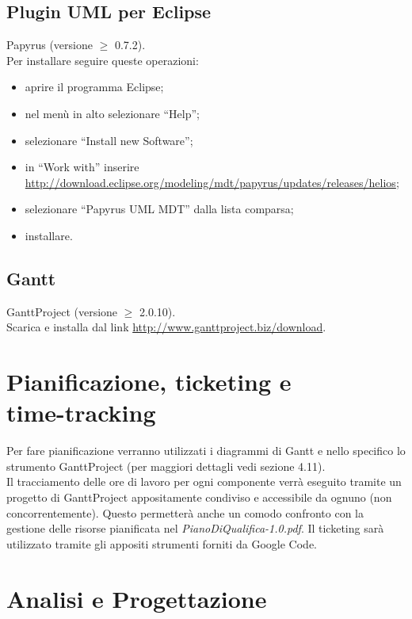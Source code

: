 \section{Plugin UML per Eclipse}
Papyrus (versione $\geq$ 0.7.2). 
\\
Per installare seguire queste
operazioni: 
\begin{itemize}
\item {aprire il programma Eclipse;} 
\item {nel men\`u in alto selezionare ``Help'';}
\item {selezionare ``Install new Software'';}
\item {in ``Work with'' inserire} \\
{\url{http://download.eclipse.org/modeling/mdt/papyrus/updates/releases/helios};}
\item {selezionare ``Papyrus UML MDT'' dalla lista comparsa;}
\item {installare.}
\end{itemize} 

\section{Gantt}
GanttProject (versione $\geq$ 2.0.10). 
\\
Scarica e installa dal link
\url{http://www.ganttproject.biz/download}.


\chapter{Pianificazione, ticketing e \\time-tracking}
\thispagestyle{fancy}
Per fare pianificazione verranno utilizzati i diagrammi di Gantt e nello
specifico lo strumento GanttProject (per maggiori dettagli vedi sezione 4.11). 
\\Il tracciamento delle ore di lavoro per ogni componente verr\`a eseguito
tramite un progetto di GanttProject appositamente condiviso e accessibile da ognuno (non concorrentemente). Questo permetter\`a anche un comodo confronto con la
gestione delle risorse pianificata nel \emph{PianoDiQualifica-1.0.pdf}.
Il ticketing sar\`a utilizzato tramite gli appositi strumenti forniti da Google
Code.


\chapter{Analisi e Progettazione}
\thispagestyle{fancy} 

